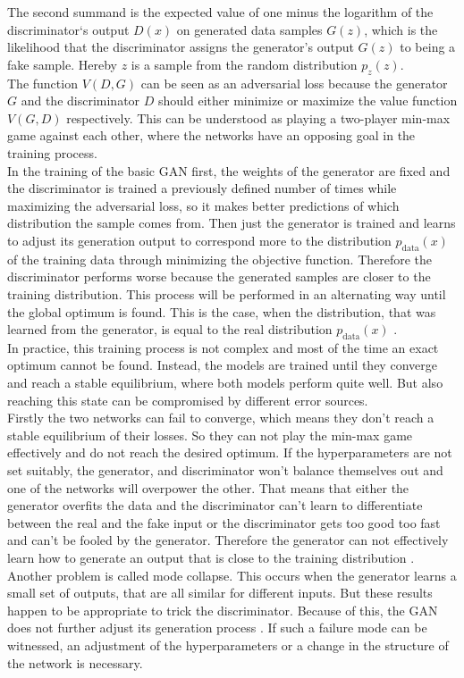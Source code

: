 The second summand is the expected value of one minus the logarithm of the discriminator`s output $D(x)$ on generated data samples $G(z)$, which is the likelihood that the discriminator assigns the generator's output $G(z)$ to being a fake sample.
Hereby $z$ is a sample from the random distribution $p_z(z)$.\\
The function $V(D,G)$ can be seen as an adversarial loss because the generator $G$ and the discriminator $D$ should either minimize or maximize the value function $V(G,D)$ respectively.
This can be understood as playing a two-player min-max game against each other, where the networks have an opposing goal in the training process.\\
In the training of the basic GAN first, the weights of the generator are fixed and the discriminator is trained a previously defined number of times while maximizing the adversarial loss, so it makes better predictions of which distribution the sample comes from.
Then just the generator is trained and learns to adjust its generation output to correspond more to the distribution $p_{\text{data}}(x)$ of the training data through minimizing the objective function.
Therefore the discriminator performs worse because the generated samples are closer to the training distribution.
This process will be performed in an alternating way until the global optimum is found.
This is the case, when the distribution, that was learned from the generator, is equal to the real distribution $p_{\text{data}}(x)$ \cite{Goodfellow2014}.\\
In practice, this training process is not complex and most of the time an exact optimum cannot be found.
Instead, the models are trained until they converge and reach a stable equilibrium, where both models perform quite well.  
But also reaching this state can be compromised by different error sources.\\
Firstly the two networks can fail to converge, which means they don't reach a stable equilibrium of their losses.
So they can not play the min-max game effectively and do not reach the desired optimum.
If the hyperparameters are not set suitably, the generator, and discriminator won't balance themselves out and one of the networks will overpower the other.
That means that either the generator overfits the data and the discriminator can't learn to differentiate between the real and the fake input or the discriminator gets too good too fast and can't be fooled by the generator. 
Therefore the generator can not effectively learn how to generate an output that is close to the training distribution \cite{Creswell2018}.\\
Another problem is called mode collapse. 
This occurs when the generator learns a small set of outputs, that are all similar for different inputs.
But these results happen to be appropriate to trick the discriminator. Because of this, the GAN does not further adjust its generation process \cite{Creswell2018}.
If such a failure mode can be witnessed, an adjustment of the hyperparameters or a change in the structure of the network is necessary.


